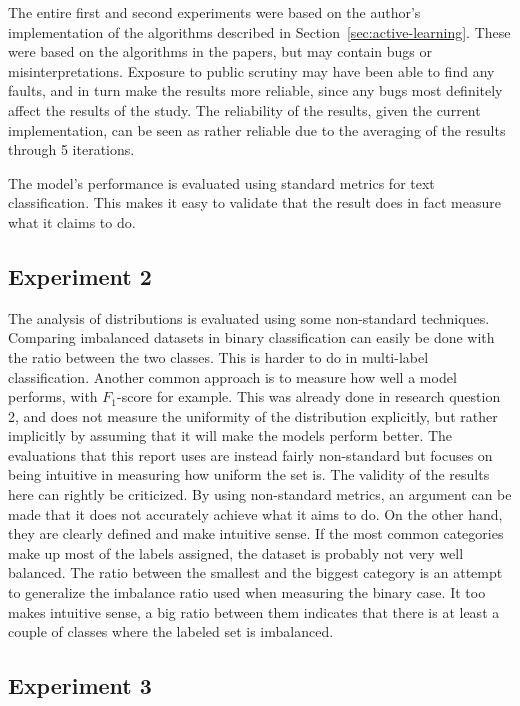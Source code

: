 The entire first and second experiments were based on the author's implementation of the algorithms described in Section~\ref{sec:active-learning}.
These were based on the algorithms in the papers, but may contain bugs or misinterpretations.
Exposure to public scrutiny may have been able to find any faults, and in turn make the results more reliable, since any bugs most definitely affect the results of the study.
The reliability of the results, given the current implementation, can be seen as rather reliable due to the averaging of the results through 5 iterations.

The model's performance is evaluated using standard metrics for text classification.
This makes it easy to validate that the result does in fact measure what it claims to do.

\subsection{Experiment 2}

The analysis of distributions is evaluated using some non-standard techniques.
Comparing imbalanced datasets in binary classification can easily be done with the ratio between the two classes.
This is harder to do in multi-label classification. 
Another common approach is to measure how well a model performs, with $F_1$-score for example.
This was already done in research question 2, and does not measure the uniformity of the distribution explicitly, but rather implicitly by assuming that it will make the models perform better.
The evaluations that this report uses are instead fairly non-standard but focuses on being intuitive in measuring how uniform the set is.
The validity of the results here can rightly be criticized.
By using non-standard metrics, an argument can be made that it does not accurately achieve what it aims to do.
On the other hand, they are clearly defined and make intuitive sense.
If the most common categories make up most of the labels assigned, the dataset is probably not very well balanced.
The ratio between the smallest and the biggest category is an attempt to generalize the imbalance ratio used when measuring the binary case.
It too makes intuitive sense, a big ratio between them indicates that there is at least a couple of classes where the labeled set is imbalanced.

\subsection{Experiment 3}

